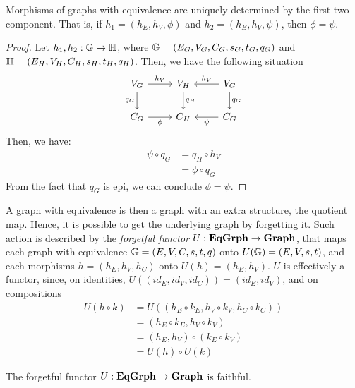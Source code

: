\begin{obs}\label{obs:eq_grph_morph_det_by_first_two_comp}
    Morphisms of graphs with equivalence are uniquely determined by the first two component. That is, if $h_1 = (h_E, h_V, \phi)$ and $h_2 = (h_E, h_V, \psi)$, then $\phi = \psi$.
\end{obs}

\begin{proof}
    Let $h_1, h_2 : \mathbb{G \to H}$, where $\mathbb{G} = (E_G, V_G, C_G, s_G, t_G, q_G)$ and $\mathbb{H} = (E_H, V_H, C_H, s_H, t_H, q_H)$. Then, we have the following situation
    \[
        \begin{tikzcd}
            V_G \arrow[r, "{h_V}"] \arrow[d, "{q_G}"swap] & V_H \arrow[d, "{q_H}"] & V_G \arrow[l, "{h_V}"swap] \arrow[d, "{q_G}"] \\
            C_G \arrow[r, "{\phi}"swap] & C_H & \arrow[l, "{\psi}"] C_G
        \end{tikzcd}
     \]
     Then, we have:
     \begin{align*}
         \psi \circ q_G &= q_H \circ h_V \\
                        &= \phi \circ q_G
     \end{align*}
     From the fact that $q_G$ is epi, we can conclude $\phi = \psi$.
\end{proof}

A graph with equivalence is then a graph with an extra structure, the quotient map. Hence, it is possible to get the underlying graph by forgetting it. Such action is described by the \emph{forgetful functor} $U : \mathbf{EqGrph} \to \mathbf{Graph}$, that maps each graph with equivalence $\mathbb{G} =  (E, V, C, s, t, q)$ onto $U(\mathbb{G}) = (E, V, s, t)$, and each morphisms $h = (h_E, h_V, h_C)$ onto $U(h) = (h_E, h_V)$. $U$ is effectively a functor, since, on identities, $U((id_E, id_V, id_C)) = (id_E, id_V)$, and on compositions 
\[\begin{split}
	U(h \circ k) &= U((h_E \circ k_E, h_V \circ k_V, h_C \circ k_C))\\ &= (h_E \circ k_E, h_V \circ k_V) \\&= (h_E, h_V) \circ (k_E \circ k_V) \\&= U(h) \circ U(k)
\end{split}\]

\begin{prop}\label{prop:U_is_faithf}
    The forgetful functor $U: \mathbf{EqGrph} \to \mathbf{Graph}$ is faithful.
\end{prop}

